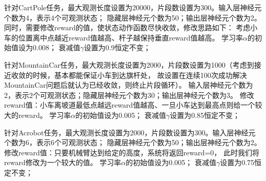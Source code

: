 \documentclass[a4paper,UTF8]{article}
\theoremstyle{definition}
\begin{document}
针对CartPole任务，最大观测长度设置为20000，片段数设置为300。输入层神经元个数为4，表示4个可观测状态；
隐藏层神经元个数为50；输出层神经元个数为2。同时，需要修改reward的值，使状态动作函数尽快收敛，修改思路如下：
考虑小车的位置离中点越近reward值越高、杆子越保持垂直reward值越高。
学习率$\alpha$的初始值设为0.008；
衰减值$\gamma$设置为0.9恒定不变；

针对MountainCar任务，最大观测长度设置为2000，片段数设置为1000（考虑到接近收敛的时候，基本都能保证小车到达旗杆处，
故设置在连续100次成功解决MountainCar问题后就认为已经收敛，则终止片段循环）。
输入层神经元个数为2，表示2个可观测状态；隐藏层神经元个数为30；输出层神经元个数为3。
修改reward值：小车离坡道最低点越远reward值越高、一旦小车达到最高点则给一个较大的reward。
学习率$\alpha$的初始值设为0.005；
衰减值$\gamma$设置为0.85恒定不变；

针对Acrobot任务，最大观测长度设置为2000，片段数设置为300。输入层神经元个数为6，表示6个可观测状态；
隐藏层神经元个数为50；输出层神经元个数为2。修改reward值：只要机械臂达到给定的高度，系统将返回reward=0，
此时我们将reward修改为一个较大的值。
学习率$\alpha$的初始值设为0.005；
衰减值$\gamma$设置为0.75恒定不变；
\end{document}
